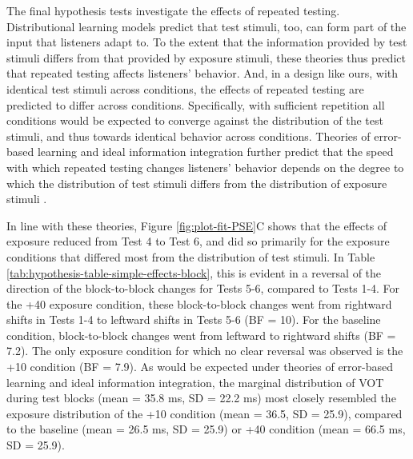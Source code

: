 \documentclass[
  11pt,
  man,mask,floatsintext]{apa6}
\begin{document}
The final hypothesis tests investigate the effects of repeated testing. Distributional learning models predict that test stimuli, too, can form part of the input that listeners adapt to. To the extent that the information provided by test stimuli differs from that provided by exposure stimuli, these theories thus predict that repeated testing affects listeners' behavior. And, in a design like ours, with identical test stimuli across conditions, the effects of repeated testing are predicted to differ across conditions. Specifically, with sufficient repetition all conditions would be expected to converge against the distribution of the test stimuli, and thus towards identical behavior across conditions. Theories of error-based learning and ideal information integration further predict that the speed with which repeated testing changes listeners' behavior depends on the degree to which the distribution of test stimuli differs from the distribution of exposure stimuli \autocites{davis-sohoglu2020,kleinschmidt-jaeger2015}[for relevant discussion, see also][]{lancia-winter2013,xie-kurumada2024}.

In line with these theories, Figure \ref{fig:plot-fit-PSE}C shows that the effects of exposure reduced from Test 4 to Test 6, and did so primarily for the exposure conditions that differed most from the distribution of test stimuli. In Table \ref{tab:hypothesis-table-simple-effects-block}, this is evident in a reversal of the direction of the block-to-block changes for Tests 5-6, compared to Tests 1-4. For the +40 exposure condition, these block-to-block changes went from rightward shifts in Tests 1-4 to leftward shifts in Tests 5-6 (BF = 10). For the baseline condition, block-to-block changes went from leftward to rightward shifts (BF = 7.2). The only exposure condition for which no clear reversal was observed is the +10 condition (BF = 7.9). As would be expected under theories of error-based learning and ideal information integration, the marginal distribution of VOT during test blocks (mean = 35.8 ms, SD = 22.2 ms) most closely resembled the exposure distribution of the +10 condition (mean = 36.5, SD = 25.9), compared to the baseline (mean = 26.5 ms, SD = 25.9) or +40 condition (mean = 66.5 ms, SD = 25.9).
\end{document}
